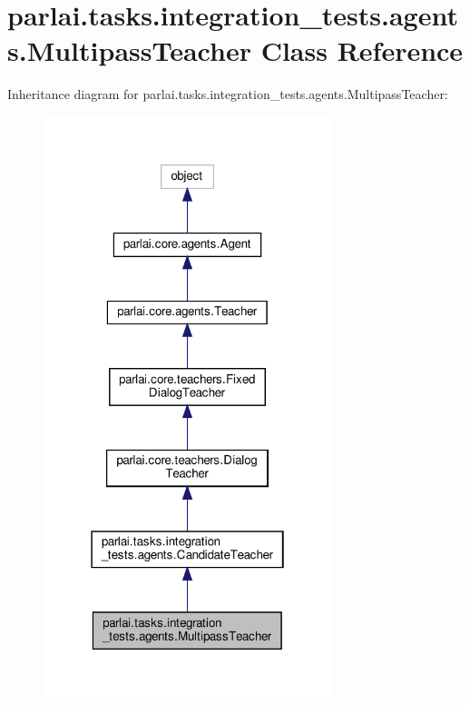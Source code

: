 \hypertarget{classparlai_1_1tasks_1_1integration__tests_1_1agents_1_1MultipassTeacher}{}\section{parlai.\+tasks.\+integration\+\_\+tests.\+agents.\+Multipass\+Teacher Class Reference}
\label{classparlai_1_1tasks_1_1integration__tests_1_1agents_1_1MultipassTeacher}


Inheritance diagram for parlai.\+tasks.\+integration\+\_\+tests.\+agents.\+Multipass\+Teacher\+:
\nopagebreak
\begin{figure}[H]
\begin{center}
\leavevmode
\includegraphics[width=238pt]{classparlai_1_1tasks_1_1integration__tests_1_1agents_1_1MultipassTeacher__inherit__graph}
\end{center}
\end{figure}


